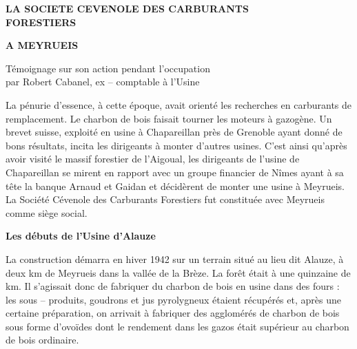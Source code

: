 \clearpage


\begin{center}
    {\Large\bfseries
    LA SOCIETE CEVENOLE DES CARBURANTS\\
    FORESTIERS
    }

    \vspace{0.7cm}

    {\Large\bfseries
    A MEYRUEIS
    }

    \vspace{0.9cm}

    Témoignage sur son action pendant l’occupation\\
    par Robert Cabanel, ex – comptable à l’Usine
\end{center}

\vspace{1.1cm}

La pénurie d’essence, à cette époque, avait orienté les recherches en carburants de
remplacement. Le charbon de bois faisait tourner les moteurs à gazogène. Un brevet suisse,
exploité en usine à Chapareillan près de Grenoble ayant donné de bons résultats, incita les
dirigeants à monter d’autres usines. C’est ainsi qu’après avoir visité le massif forestier de
l’Aigoual, les dirigeants de l’usine de Chapareillan se mirent en rapport avec un groupe
financier de Nîmes ayant à sa tête la banque Arnaud et Gaidan et décidèrent de monter une
usine à Meyrueis. La Société Cévenole des Carburants Forestiers fut constituée avec Meyrueis
comme siège social.

\vspace{0.45cm}

\textbf{Les débuts de l’Usine d’Alauze}

\vspace{0.35cm}

La construction démarra en hiver 1942 sur un terrain situé au lieu dit Alauze, à deux km de
Meyrueis dans la vallée de la Brèze. La forêt était à une quinzaine de km. Il s’agissait donc de
fabriquer du charbon de bois en usine dans des fours : les sous – produits, goudrons et jus
pyrolygneux étaient récupérés et, après une certaine préparation, on arrivait à fabriquer des
agglomérés de charbon de bois sous forme d’ovoïdes dont le rendement dans les gazos était
supérieur au charbon de bois ordinaire.

\vspace{0.45cm}

